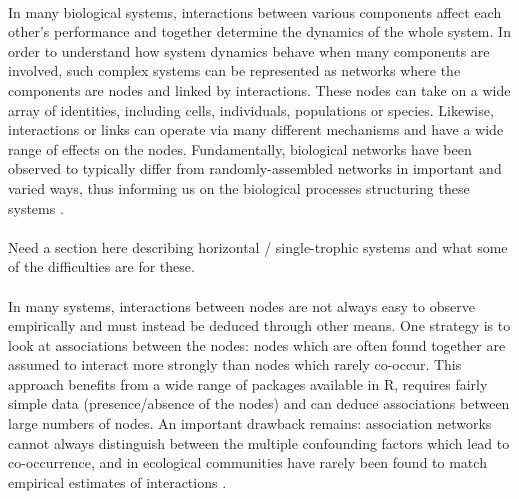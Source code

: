 \documentclass[a4,12pt]{article}
\begin{document}
    
    \paragraph{}
    In many biological systems, interactions between various components affect each other's performance and together determine the dynamics of the whole system. In order to understand how system dynamics behave when many components are involved, such complex systems can be represented as networks where the components are nodes and linked by interactions. These nodes can take on a wide array of identities, including cells, individuals, populations or species. Likewise, interactions or links can operate via many different mechanisms and have a wide range of effects on the nodes. Fundamentally, biological networks have been observed to typically differ from randomly-assembled networks in important and varied ways, thus informing us on the biological processes structuring these systems \parencite{Dunne2002}.

    \paragraph{}
    Need a section here describing horizontal / single-trophic systems and what some of the difficulties are for these. 

    \paragraph{} 
    In many systems, interactions between nodes are not always easy to observe empirically and must instead be deduced through other means. One strategy is to look at associations between the nodes: nodes which are often found together are assumed to interact more strongly than nodes which rarely co-occur. This approach benefits from a wide range of packages available in R, requires fairly simple data (presence/absence of the nodes) and can deduce associations between large numbers of nodes. An important drawback remains: association networks cannot always distinguish between the multiple confounding factors which lead to co-occurrence, and in ecological communities have rarely been found to match empirical estimates of interactions \parencite{Sander2017,Barner2018, Thurman2019, Blanchet2020}.
\end{document}
